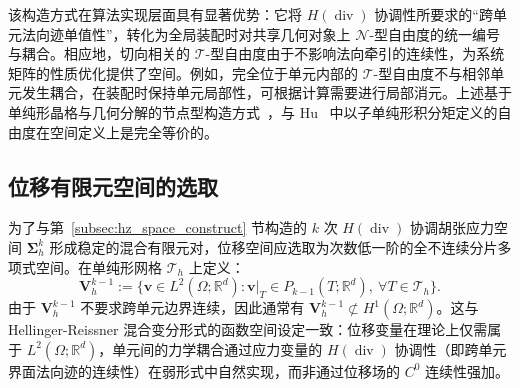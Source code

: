 该构造方式在算法实现层面具有显著优势：它将 $H(\operatorname{div})$ 协调性所要求的“跨单元法向迹单值性”，转化为全局装配时对共享几何对象上 $\mathcal{N}$-型自由度的统一编号与耦合。相应地，切向相关的 $\mathcal{T}$-型自由度由于不影响法向牵引的连续性，为系统矩阵的性质优化提供了空间。例如，完全位于单元内部的 $\mathcal{T}$-型自由度不与相邻单元发生耦合，在装配时保持单元局部性，可根据计算需要进行局部消元。上述基于单纯形晶格与几何分解的节点型构造方式~\cite{chenGeometricDecompositionEfficient2024b}，与 Hu~\cite{huFiniteElementApproximations2015} 中以子单纯形积分矩定义的自由度在空间定义上是完全等价的。

%


\subsection{位移有限元空间的选取}
\label{subsec:disp_fem_space}

为了与第~\ref{subsec:hz_space_construct} 节构造的 $k$ 次 $H(\operatorname{div})$ 协调胡张应力空间 $\boldsymbol{\Sigma}_h^k$ 形成稳定的混合有限元对，位移空间应选取为次数低一阶的全不连续分片多项式空间。在单纯形网格 $\mathcal{T}_h$ 上定义：
\begin{equation} \label{eq:ch5_hz_global_disp_space}
	\boldsymbol{V}_h^{k-1} := \{ \boldsymbol{v} \in L^2(\Omega; \mathbb{R}^d) : \boldsymbol{v}|_T \in P_{k-1}(T; \mathbb{R}^d), \ \forall T \in \mathcal{T}_h \}.
\end{equation}
由于 $\boldsymbol{V}_h^{k-1}$ 不要求跨单元边界连续，因此通常有 $\boldsymbol{V}_h^{k-1}\not\subset H^1(\Omega;\mathbb{R}^d)$。这与 Hellinger-Reissner 混合变分形式的函数空间设定一致：位移变量在理论上仅需属于 $L^2(\Omega;\mathbb R^d)$，单元间的力学耦合通过应力变量的 $H(\operatorname{div})$ 协调性（即跨单元界面法向迹的连续性）在弱形式中自然实现，而非通过位移场的 $C^0$ 连续性强加。

